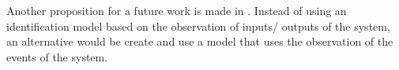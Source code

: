Another proposition for a future work is made in . Instead
of using an identification model based on the observation of inputs\slash
outputs of the system, an alternative would be create and use a model that uses the observation of
the events of the system.





